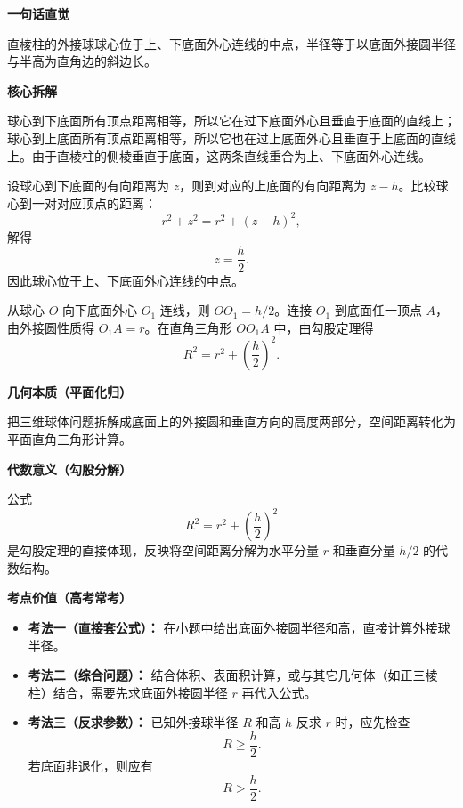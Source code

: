 \begin{explanationbox}
	\textbf{\textcolor{CExplanation}{一句话直觉}}

	直棱柱的外接球球心位于上、下底面外心连线的中点，半径等于以底面外接圆半径与半高为直角边的斜边长。

	\medskip
	\textbf{\textcolor{CExplanation}{核心拆解}}
	\begin{description}[style=nextline, leftmargin=2.8em, labelsep=0.5em, itemsep=0.45em]
		\item[\textbf{要点一（球心定位）：}]
		      球心到下底面所有顶点距离相等，所以它在过下底面外心且垂直于底面的直线上；球心到上底面所有顶点距离相等，所以它也在过上底面外心且垂直于上底面的直线上。由于直棱柱的侧棱垂直于底面，这两条直线重合为上、下底面外心连线。

		\item[\textbf{要点二（中点来源）：}]
		      设球心到下底面的有向距离为 $z$，则到对应的上底面的有向距离为 $z-h$。比较球心到一对对应顶点的距离：
		      \[
			      r^{2}+z^{2}=r^{2}+(z-h)^{2},
		      \]
		      解得
		      \[
			      z=\frac{h}{2}.
		      \]
		      因此球心位于上、下底面外心连线的中点。

		\item[\textbf{要点三（半径构造）：}]
		      从球心 $O$ 向下底面外心 $O_1$ 连线，则 $OO_1 = h/2$。连接 $O_1$ 到底面任一顶点 $A$，由外接圆性质得 $O_1A = r$。在直角三角形 $OO_1A$ 中，由勾股定理得
		      \[
			      R^2 = r^2 + \left(\frac{h}{2}\right)^2.
		      \]
	\end{description}

	\medskip
	\textbf{\textcolor{CExplanation}{几何本质（平面化归）}}

	把三维球体问题拆解成底面上的外接圆和垂直方向的高度两部分，空间距离转化为平面直角三角形计算。

	\medskip
	\textbf{\textcolor{CExplanation}{代数意义（勾股分解）}}

	公式
	\[
		R^2 = r^2 + \left(\frac{h}{2}\right)^2
	\]
	是勾股定理的直接体现，反映将空间距离分解为水平分量 $r$ 和垂直分量 $h/2$ 的代数结构。

	\medskip
	\textbf{\textcolor{CExplanation}{考点价值（高考常考）}}
	\begin{itemize}[leftmargin=*, itemsep=0.5em, topsep=0.4em]
		\item \textbf{考法一（直接套公式）：} 在小题中给出底面外接圆半径和高，直接计算外接球半径。
		\item \textbf{考法二（综合问题）：} 结合体积、表面积计算，或与其它几何体（如正三棱柱）结合，需要先求底面外接圆半径 $r$ 再代入公式。
		\item \textbf{考法三（反求参数）：} 已知外接球半径 $R$ 和高 $h$ 反求 $r$ 时，应先检查
		      \[
			      R\geq \frac{h}{2}.
		      \]
		      若底面非退化，则应有
		      \[
			      R>\frac{h}{2}.
		      \]
	\end{itemize}


\end{explanationbox}
